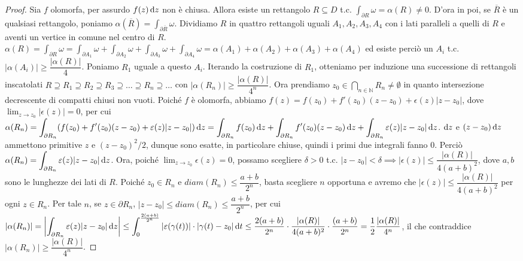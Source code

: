 \begin{proof}
  Sia $f$ olomorfa, per assurdo $f(z)\mathop{}\!\mathrm{d} z$ non è chiusa. Allora esiste un rettangolo $R \subseteq D$ t.c. $\displaystyle \int_{\partial R} \omega=\alpha(R)\not=0$. D'ora in poi, se $\overline{R}$ è un qualsiasi rettangolo, poniamo $\alpha(\overline{R})=\int_{\partial \overline{R}} \omega$. Dividiamo $R$ in quattro rettangoli uguali $A_1, A_2, A_3, A_4$ con i lati paralleli a quelli di $R$ e aventi un vertice in comune nel centro di $R$.
  $\displaystyle \alpha(R)=\int_{\partial R} \omega=\int_{\partial A_1} \omega+\int_{\partial A_2} \omega+\int_{\partial A_3} \omega+\int_{\partial A_4} \omega=\alpha(A_1)+\alpha(A_2)+\alpha(A_3)+\alpha(A_4)$ ed esiste perciò un $A_i$ t.c. $|\alpha(A_i)|\ge \dfrac{|\alpha(R)|}{4}$.
  Poniamo $R_1$ uguale a questo $A_i$. Iterando la costruzione di $R_1$, otteniamo per induzione una successione di rettangoli inscatolati $R \supseteq R_1 \supseteq R_2 \supseteq R_3 \supseteq \dots \supseteq R_n \supseteq \dots$ con $|\alpha(R_n)|\ge \dfrac{|\alpha(R)|}{4^n}$. Ora prendiamo $\displaystyle z_0 \in \bigcap_{n \in \mathbb{N}} R_n \not=\emptyset$ in quanto intersezione decrescente di compatti chiusi non vuoti.
  Poiché $f$ è olomorfa, abbiamo $f(z)=f(z_0)+f'(z_0)(z-z_0)+\epsilon(z)|z-z_0|$, dove $\displaystyle \lim_{z \longrightarrow z_0} |\epsilon(z)|=0$, per cui $\displaystyle \alpha(R_n)=\int_{\partial R_n} (f(z_0)+f'(z_0)(z-z_0)+\varepsilon(z)|z-z_0|)\mathop{}\!\mathrm{d} z=\int_{\partial R_n} f(z_0)\mathop{}\!\mathrm{d} z+\int_{\partial R_n} f'(z_0)(z-z_0)\mathop{}\!\mathrm{d} z+\int_{\partial R_n} \varepsilon(z)|z-z_0|\mathop{}\!\mathrm{d} z$.
  $\mathop{}\!\mathrm{d} z$ e $(z-z_0)\mathop{}\!\mathrm{d} z$ ammettono primitive $z$ e $(z-z_0)^2/2$, dunque sono esatte, in particolare chiuse, quindi i primi due integrali fanno $0$. Perciò $\displaystyle \alpha(R_n)=\int_{\partial R_n} \varepsilon(z)|z-z_0|\mathop{}\!\mathrm{d} z$.
  Ora, poiché $\displaystyle \lim_{z \longrightarrow z_0} \epsilon(z)=0$, possamo scegliere $\delta>0$ t.c. $|z-z_0|<\delta \implies |\epsilon(z)|\le \dfrac{|\alpha(R)|}{4(a+b)^2}$, dove $a, b$ sono le lunghezze dei lati di $R$.
  Poiché $z_0 \in R_n$ e $diam(R_n) \le \dfrac{a+b}{2^n}$, basta scegliere $n$ opportuna e avremo che $|\epsilon(z)|\le \dfrac{|\alpha(R)|}{4(a+b)^2}$ per ogni $z \in R_n$.
  Per tale $n$, se $z \in \partial R_n$, $|z-z_0| \le diam(R_n) \le \dfrac{a+b}{2^n}$, per cui $\displaystyle |\alpha(R_n)|=\left|\int_{\partial R_n} \varepsilon(z)|z-z_0|\mathop{}\!\mathrm{d} z\right|\le\int_0^{\frac{2(a+b)}{2^n}} |\varepsilon(\gamma(t))|\cdot|\gamma(t)-z_0|\mathop{}\!\mathrm{d} t \le \dfrac{2(a+b)}{2^n}\cdot\dfrac{|\alpha(R)|}{4(a+b)^2}\cdot\dfrac{(a+b)}{2^n}=\dfrac{1}{2}\dfrac{|\alpha(R)|}{4^n}$, il che contraddice $|\alpha(R_n)| \ge \dfrac{|\alpha(R)|}{4^n}$.
\end{proof}

